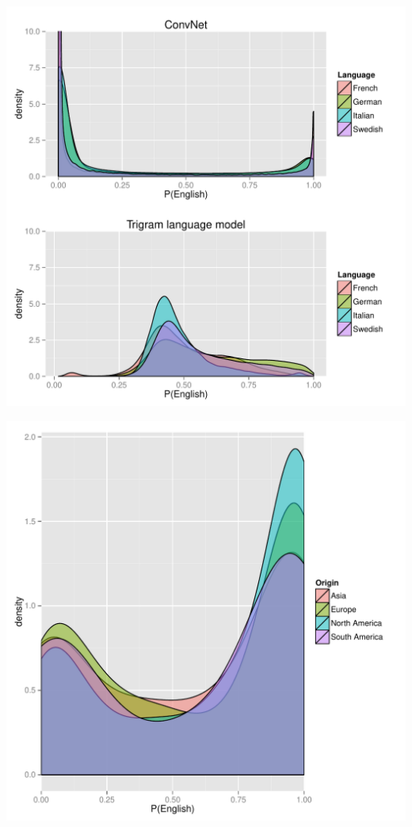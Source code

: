 \begin{frame}
\centering
\includegraphics[height=0.99\textheight]{figures/chapter03/languages-convnet-vs-lm}
\end{frame}

\begin{frame}
\centering
\includegraphics[height=0.99\textheight]{figures/chapter03/brands-convnet}
\end{frame}
